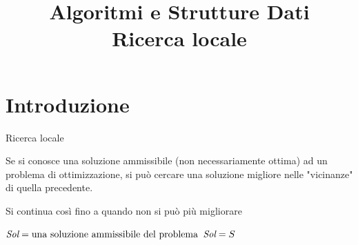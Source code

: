
\title[ASD - Ricerca locale]{\textbf{Algoritmi e Strutture Dati}\\[24pt]Ricerca locale}

\usepackage{xcolor}
\usepackage{colortbl}
\usepackage{epigraph}
\usepackage{tikz}
\usetikzlibrary{trees}
\usetikzlibrary{matrix}
\usetikzlibrary{graphs}
\usetikzlibrary{shapes}
\usetikzlibrary{positioning}
\usepackage{xmpmulti}
\usepackage{listings}



\newcommand*\circled[1]{\tikz[baseline=(char.base)]{
            \node[circle,ball color=blue, shade, 
 color=white,inner sep=1.2pt] (char) {\tiny #1};}}

\newcommand{\R}[1]{\textcolor{red}{#1}}
\newcommand{\B}[1]{\textcolor{blue}{#1}}
\newcommand{\G}[1]{\textcolor{violet}{#1}}

\graphicspath{{figs/15/}}




\FrameTitle{}

\FrameContent



\section{Introduzione}

\begin{frame}{Ricerca locale}

Se si conosce una soluzione ammissibile (non necessariamente ottima) ad un
problema di ottimizzazione, si può cercare una soluzione migliore
nelle "vicinanze" di quella precedente. 

\bigskip
Si continua così fino a quando non si può più migliorare


\begin{Procedure}
\caption[A]{\ricercalocale()}
$\textit{Sol} = \textrm{una soluzione ammissibile del problema}$\;
{
  $\textit{Sol} = S$\;
}
\Return \Sol\;
\end{Procedure}


\end{frame}

